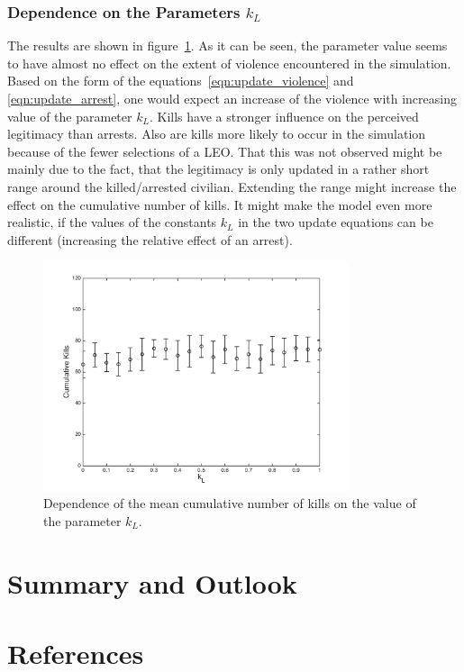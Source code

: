 \documentclass[11pt]{article}
\begin{document}
\subsubsection{Dependence on the Parameters $k_L$}
The results are shown in figure~\ref{fig:k_L_dep}. As it can be seen, the parameter value seems to have almost no effect on the extent of violence encountered in the simulation. Based on the form of the equations~\eqref{eqn:update_violence} and \eqref{eqn:update_arrest}, one would expect an increase of the violence with increasing value of the parameter $k_L$. Kills have a stronger influence on the perceived legitimacy than arrests. Also are kills more likely to occur in the simulation because of the fewer selections of a LEO. That this was not observed might be mainly due to the fact, that the legitimacy is only updated in a rather short range around the killed/arrested civilian. Extending the range might increase the effect on the cumulative number of kills. It might make the model even more realistic, if the values of the constants $k_L$ in the two update equations can be different (increasing the relative effect of an arrest).
\begin{figure}[!htbp]
	\centering
		\includegraphics[width=0.80\textwidth]{../../code/modified_model/k_L_dep.png}
	\caption{Dependence of the mean cumulative number of kills on the value of the parameter $k_L$.}
	\label{fig:k_L_dep}
\end{figure}

\section{Summary and Outlook}

\section{References}
\end{document}
